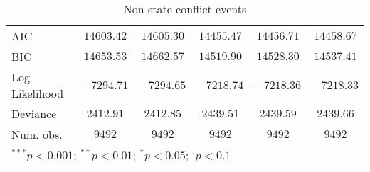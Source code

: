 \begin{sidewaystable}
\begin{center}
{\begin{tabular}{l c c c c c}
\hline
AIC                                   & $14603.42$    & $14605.30$    & $14455.47$    & $14456.71$    & $14458.67$    \\
BIC                                   & $14653.53$    & $14662.57$    & $14519.90$    & $14528.30$    & $14537.41$    \\
Log Likelihood                        & $-7294.71$    & $-7294.65$    & $-7218.74$    & $-7218.36$    & $-7218.33$    \\
Deviance                              & $2412.91$     & $2412.85$     & $2439.51$     & $2439.59$     & $2439.66$     \\
Num. obs.                             & $9492$        & $9492$        & $9492$        & $9492$        & $9492$        \\
\hline
\multicolumn{6}{l}{\scriptsize{$^{***}p<0.001$; $^{**}p<0.01$; $^{*}p<0.05$; $^{\cdot}p<0.1$}}
\end{tabular}
}
\caption{Non-state conflict events}
\label{non_state}
\end{center}
\end{sidewaystable}
